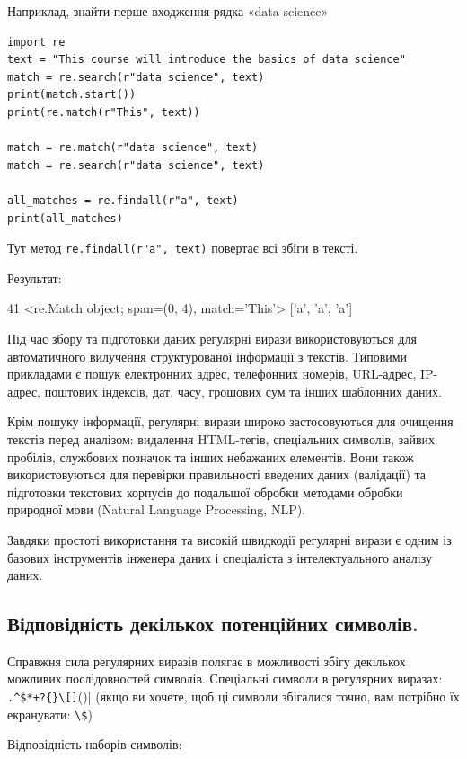 Наприклад, знайти перше входження рядка «data science»

\begin{lstlisting}
import re
text = "This course will introduce the basics of data science"
match = re.search(r"data science", text)
print(match.start())
print(re.match(r"This", text))

match = re.match(r"data science", text) 
match = re.search(r"data science", text) 

all_matches = re.findall(r"a", text) 
print(all_matches)
\end{lstlisting}

Тут метод \verb|re.findall(r"a", text)| повертає всі збіги в тексті.

Результат:

\begin{console}
41
<re.Match object; span=(0, 4), match='This'>
['a', 'a', 'a']
\end{console}

Під час збору та підготовки даних регулярні вирази використовуються для автоматичного вилучення 
структурованої інформації з текстів. Типовими прикладами є пошук електронних адрес, телефонних 
номерів, URL-адрес, IP-адрес, поштових індексів, дат, часу, грошових сум та інших шаблонних даних.

Крім пошуку інформації, регулярні вирази широко застосовуються для очищення текстів перед аналізом: 
видалення HTML-тегів, спеціальних символів, зайвих пробілів, службових позначок та інших небажаних 
елементів. Вони також використовуються для перевірки правильності введених даних (валідації) та 
підготовки текстових корпусів до подальшої обробки методами обробки природної мови (Natural 
Language Processing, NLP).

Завдяки простоті використання та високій швидкодії регулярні вирази є одним із базових 
інструментів інженера даних і спеціаліста з інтелектуального аналізу даних.

\subsection{Відповідність декількох потенційних символів.}

Справжня сила регулярних виразів полягає в можливості збігу декількох можливих послідовностей 
символів. Спеціальні символи в регулярних виразах: \verb|.^$*+?{}\[]|()| (якщо 
ви хочете, щоб ці символи збігалися точно, вам потрібно їх екранувати: \verb|\$|)

Відповідність наборів символів:

